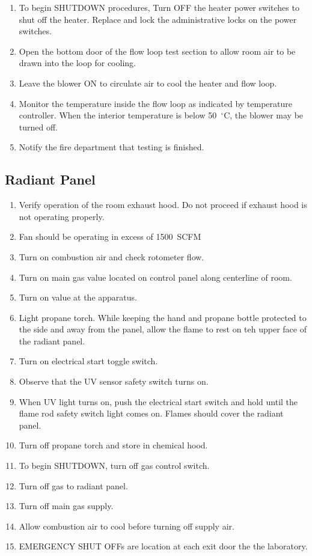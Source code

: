 \documentclass[12pt,oneside]{book}
\begin{document}
\begin{enumerate}
  \item To begin SHUTDOWN procedures, Turn OFF the heater power switches to shut off the heater. Replace and lock the administrative locks on the power switches.
  \item Open the bottom door of the flow loop test section to allow room air to be drawn into the loop for cooling.
  \item Leave the blower ON to circulate air to cool the heater and flow loop.   
  \item Monitor the temperature inside the flow loop as indicated by temperature controller.  When the interior temperature is below 50~$^{\circ}$C, the blower may be turned off.
  \item Notify the fire department that testing is finished.
\end{enumerate}

\subsection{Radiant Panel}
\label{proc_radpanel}
\begin{enumerate}
  \item Verify operation of the room exhaust hood. Do not proceed if exhaust hood is not operating properly.
  \item Fan should be operating in excess of 1500~SCFM
  \item Turn on combustion air and check rotometer flow.
  \item Turn on main gas value located on control panel along centerline of room.
  \item Turn on value at the apparatus.
  \item Light propane torch. While keeping the hand and propane bottle protected to the side and away from the panel, allow the flame to rest on teh upper face of the radiant panel.
  \item Turn on electrical start toggle switch.
  \item Observe that the UV sensor safety switch turns on.
  \item When UV light turns on, push the electrical start switch and hold until the flame rod safety switch light comes on. Flames should cover the radiant panel.
  \item Turn off propane torch and store in chemical hood.
  \item To begin SHUTDOWN, turn off gas control switch.
  \item Turn off gas to radiant panel.
  \item Turn off main gas supply.
  \item Allow combustion air to cool before turning off supply air.
  \item EMERGENCY SHUT OFFs are location at each exit door the the laboratory.      
\end{enumerate}
\end{document}
